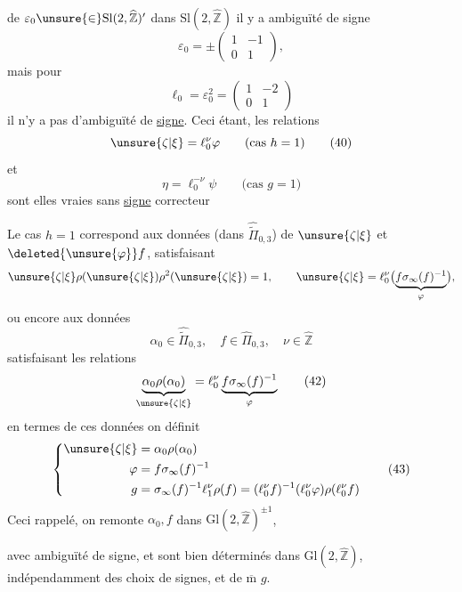 de $\varepsilon_0\unsure{\in}\mathrm{Sl}(2,\widehat{\mathbb Z})'$ dans $\mathrm{Sl}(2,\widehat{\mathbb Z})$ il y a ambiguïté de signe
\[
 \varepsilon_0=\pm\begin{pmatrix}1&-1\\0&1\end{pmatrix},
\]
mais pour
\[
 \ell_0=\varepsilon_0^2=\begin{pmatrix}1&-2\\0&1\end{pmatrix}
 \tag{39}
\]
il n'y a pas d'ambiguïté de \uline{signe}. Ceci étant, les relations
\[
 \unsure{\zeta|\xi}=\ell_0^\nu\varphi\qquad\text{(cas }h=1\text{)}
 \tag{40}
\]
et
\[
 \eta=\ell_0^{-\nu}\psi\qquad\text{(cas }g=1\text{)}
 \tag{41}
\]
sont elles vraies sans \uline{signe} correcteur 

Le cas $h=1$ correspond aux données (dans $\widehat{\widetilde{\Pi}}_{0,3}$) de $\unsure{\zeta|\xi}$ et $\deleted{\unsure{\varphi}}f$,  satisfaisant
\[
 \unsure{\zeta|\xi}\rho(\unsure{\zeta|\xi})\rho^2(\unsure{\zeta|\xi})=1,\qquad
 \unsure{\zeta|\xi}=\ell_0^\nu
 \bigl(\underbrace{f\sigma_\infty(f)^{-1}}_{\varphi}\bigr),
\]
ou encore aux données
\[
 \alpha_0\in\widehat{\widetilde{\Pi}}_{0,3},\quad
 f\in\widehat{\Pi}_{0,3},\quad\nu\in\widehat{\mathbb Z}
\]
satisfaisant les relations
\[
 \underbrace{\alpha_0\rho(\alpha_0)}_{\unsure{\zeta|\xi}}
 =\ell_0^\nu\underbrace{f\sigma_\infty(f)^{-1}}_{\varphi}
 \tag{42}
\]
en termes de ces données on définit
\[
 \left\{\begin{aligned}
 \unsure{\zeta|\xi}&=\alpha_0\rho(\alpha_0)\\
 \varphi&=f\sigma_\infty(f)^{-1}\\
 g&=\sigma_\infty(f)^{-1}\ell_1^\nu\rho(f)
 =(\ell_0^\nu f)^{-1}(\ell_0^\nu\varphi)\rho(\ell_0^\nu f)
 \end{aligned}\right.
 \tag{43}
\]
Ceci rappelé, on remonte $\alpha_0,f$ dans $\mathrm{Gl}(2,\widehat{\mathbb Z})^{\pm1}$,


avec ambiguïté de signe,  et  sont bien déterminés dans $\mathrm{Gl}(2,\widehat{\mathbb Z})$, indépendamment des choix de signes,  et de $\overline{\mathrm m}$ $g$.

